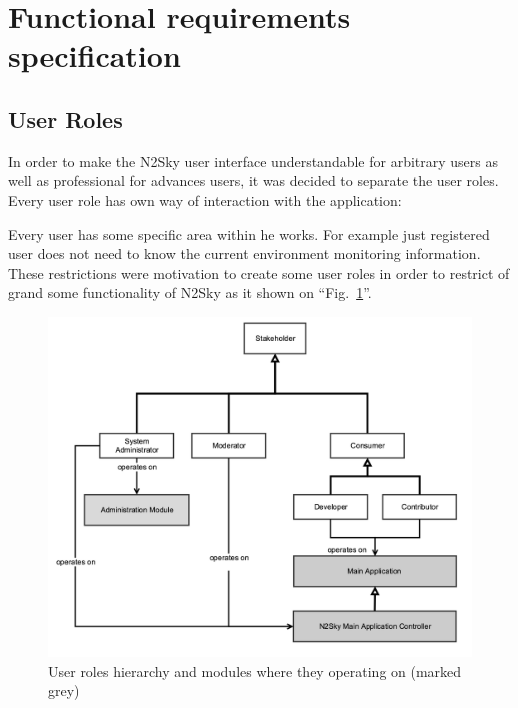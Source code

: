 \section{Functional requirements specification}\label{Functional requirements specification}

\subsection{User Roles}\label{User Roles}

In order to make the N2Sky user interface understandable for arbitrary users as well as professional for advances users, it was decided to separate the user roles. Every user role has own way of interaction with the application:

Every user has some specific area within he works. For example just registered user does not need to know the current environment monitoring information. These restrictions were motivation to create some user roles in order to restrict of grand some functionality of N2Sky as it shown on ``Fig.~\ref{fig:userroles}''.

\begin{figure}[htbp]
\begin{center}
  \includegraphics[width=\linewidth]{components/4/users.png}
  \caption{User roles hierarchy and modules where they operating on (marked grey)}
  \label{fig:userroles}
\end{center}
\end{figure}

